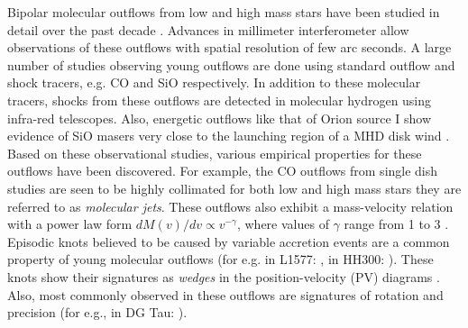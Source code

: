 \documentclass[useAMS,usenatbib]{mn2e}
\begin{document}
Bipolar molecular outflows from low and high mass stars
have been studied in detail over the past 
decade \citep[see reviews by][]{Bachiller:1996p4692,Arce:2007p798,
Tafalla:2011p14051}. Advances in millimeter interferometer 
allow observations of these outflows with spatial resolution of
few arc seconds. A large number of studies observing young
outflows are done using standard outflow and shock tracers,
e.g. CO and SiO respectively. In addition to these molecular tracers,
shocks from these outflows are detected in molecular hydrogen using
infra-red telescopes. Also, energetic outflows like that of
Orion source I show evidence of SiO masers very close to the launching
region of a MHD disk wind \citep{Goddi:2009p8571, Vaidya:2013p12777}. 
Based on these observational studies, various
empirical properties for these outflows have been discovered. For
example, the CO outflows from single dish studies are seen to be
highly collimated for both low and high mass stars
\citep[for e.g.,][]{Gueth:1999p4683, Beuther:2002p3574} they are
referred to as {\em{molecular jets}}. These outflows also exhibit a
mass-velocity relation with a power law form $ dM(v)/dv \propto
v^{-\gamma}$, where values of $\gamma$ range from 1 to 3 \cite{Downes:2003p9946}. Episodic
knots believed to be caused by variable accretion events are a common property
of young molecular outflows (for e.g. in L1577:
\citealt{Gueth:1998p14058}, in HH300: \citealt{Arce:2001p14064}). These knots show their signatures
as {\em{wedges}} in the position-velocity (PV) diagrams \cite{Arce:2001p14065}. Also, most
commonly observed in these outflows are signatures of rotation and
precision (for e.g., in DG Tau: \citealt{Bacciotti:2002p2084}).
%
\end{document}
